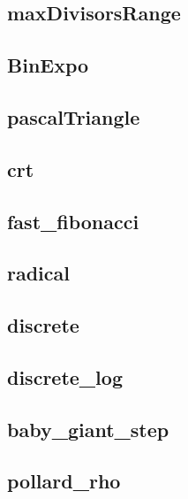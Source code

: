\subsection{maxDivisorsRange}
\raggedbottom
\hrulefill
\subsection{BinExpo}
\raggedbottom
\hrulefill
\subsection{pascalTriangle}
\raggedbottom
\hrulefill
\subsection{crt}
\raggedbottom
\hrulefill
\subsection{fast_fibonacci}
\raggedbottom
\hrulefill
\subsection{radical}
\raggedbottom
\hrulefill
\subsection{discrete}
\raggedbottom
\hrulefill
\subsection{discrete_log}
\raggedbottom
\hrulefill
\subsection{baby_giant_step}
\raggedbottom
\hrulefill
\subsection{pollard_rho}
\raggedbottom
\hrulefill
